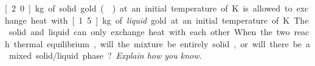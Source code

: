 \label{fnt1.2.1-8}

\unit[2.0]{kg} of solid gold () at an initial temperature of \unit[1000]{K} is allowed to exchange heat with \unit[1.5]{kg} of {\em liquid} gold at an initial temperature of \unit[1336]{K}. The solid and liquid can only exchange heat with each other. When the two reach thermal equilibrium, will the mixture be entirely solid, or will there be a mixed solid/liquid phase? {\em Explain how you know.}
